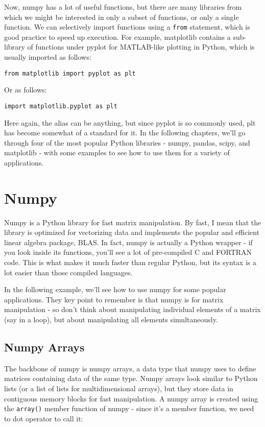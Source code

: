 \documentclass[12pt]{article}
\newcommand{\code}{\texttt}
\begin{document}
Now, numpy has a lot of useful functions, but there are many libraries from which we might be interested in only a subset of functions, or only a single function. We can selectively import functions using a \code{from} statement, which is good practice to speed up execution. For example, matplotlib contains a sub-library of functions under pyplot for MATLAB-like plotting in Python, which is usually imported as follows:

\begin{lstlisting}[frame=single] 
from matplotlib import pyplot as plt
\end{lstlisting}

Or as follows:

\begin{lstlisting}[frame=single] 
import matplotlib.pyplot as plt
\end{lstlisting}

Here again, the alias can be anything, but since pyplot is so commonly used, plt has become somewhat of a standard for it. In the following chapters, we'll go through four of the most popular Python libraries - numpy, pandas, scipy, and matplotlib - with some examples to see how to use them for a variety of applications.

\newpage
\section{Numpy}
Numpy is a Python library for fast matrix manipulation. By fast, I mean that the library is optimized for vectorizing data and implements the popular and efficient linear algebra package, BLAS. In fact, numpy is actually a Python wrapper - if you look inside its functions, you'll see a lot of pre-compiled C and FORTRAN code. This is what makes it much faster than regular Python, but its syntax is a lot easier than those compiled languages.

In the following example, we'll see how to use numpy for some popular applications. They key point to remember is that numpy is for matrix manipulation - so don't think about manipulating individual elements of a matrix (say in a loop), but about manipulating all elements simultaneously. 

\subsection{Numpy Arrays}
The backbone of numpy is numpy arrays, a data type that numpy uses to define matrices containing data of the same type. Numpy arrays look similar to Python lists (or a list of lists for multidimensional arrays), but they store data in contiguous memory blocks for fast manipulation. A numpy array is created using the \code{array()} member function of numpy - since it's a member function, we need to dot operator to call it:
\end{document}
